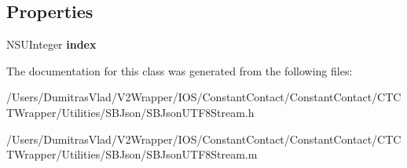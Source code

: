 \subsection*{Properties}
\begin{DoxyCompactItemize}
\item 
\hypertarget{interface_s_b_json_u_t_f8_stream_ac1851614a43a1be306e1804f8008e473}{N\-S\-U\-Integer {\bfseries index}}\label{interface_s_b_json_u_t_f8_stream_ac1851614a43a1be306e1804f8008e473}

\end{DoxyCompactItemize}


The documentation for this class was generated from the following files\-:\begin{DoxyCompactItemize}
\item 
/\-Users/\-Dumitras\-Vlad/\-V2\-Wrapper/\-I\-O\-S/\-Constant\-Contact/\-Constant\-Contact/\-C\-T\-C\-T\-Wrapper/\-Utilities/\-S\-B\-Json/S\-B\-Json\-U\-T\-F8\-Stream.\-h\item 
/\-Users/\-Dumitras\-Vlad/\-V2\-Wrapper/\-I\-O\-S/\-Constant\-Contact/\-Constant\-Contact/\-C\-T\-C\-T\-Wrapper/\-Utilities/\-S\-B\-Json/S\-B\-Json\-U\-T\-F8\-Stream.\-m\end{DoxyCompactItemize}
